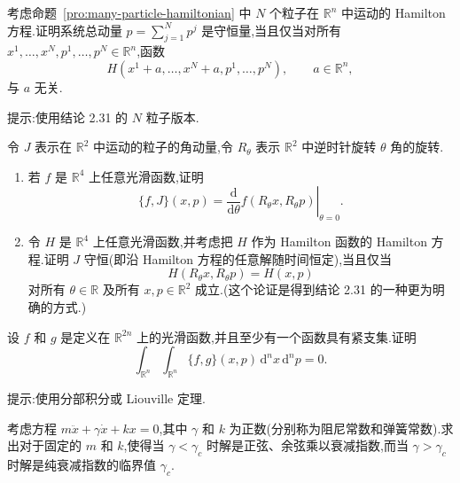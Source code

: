 \begin{exercise}\label{ex:total-momentum-hamiltonian}
考虑命题~\ref{pro:many-particle-hamiltonian} 中 $N$ 个粒子在 $\mathbb{R}^{n}$ 中运动的 Hamilton 方程.证明系统总动量 $p=\sum_{j=1}^{N}p^{j}$ 是守恒量,当且仅当对所有 $x^{1},\ldots,x^{N},p^{1},\ldots,p^{N}\in\mathbb{R}^{n}$,函数
\[
  H(x^{1}+a,\ldots,x^{N}+a,p^{1},\ldots,p^{N}),
  \qquad a\in\mathbb{R}^{n},
\]
与 $a$ 无关.
\begin{note}
提示:使用结论 2.31 的 $N$ 粒子版本.
\end{note}
\end{exercise}

\begin{exercise}\label{ex:angular-momentum-generator}
令 $J$ 表示在 $\mathbb{R}^{2}$ 中运动的粒子的角动量,令 $R_{\theta}$ 表示 $\mathbb{R}^{2}$ 中逆时针旋转 $\theta$ 角的旋转.
\begin{enumerate}[label=(\alph*)]
  \item 若 $f$ 是 $\mathbb{R}^{4}$ 上任意光滑函数,证明
  \[
    \{f,J\}(x,p)
    =\left.\frac{\mathrm{d}}{\mathrm{d}\theta}f(R_{\theta}x,R_{\theta}p)\right|_{\theta=0}.
  \]
  \item 令 $H$ 是 $\mathbb{R}^{4}$ 上任意光滑函数,并考虑把 $H$ 作为 Hamilton 函数的 Hamilton 方程.证明 $J$ 守恒(即沿 Hamilton 方程的任意解随时间恒定),当且仅当
  \[
    H(R_{\theta}x,R_{\theta}p)=H(x,p)
  \]
  对所有 $\theta\in\mathbb{R}$ 及所有 $x,p\in\mathbb{R}^{2}$ 成立.(这个论证是得到结论 2.31 的一种更为明确的方式.)
\end{enumerate}
\end{exercise}

\begin{exercise}\label{ex:poisson-integral}
设 $f$ 和 $g$ 是定义在 $\mathbb{R}^{2n}$ 上的光滑函数,并且至少有一个函数具有紧支集.证明
\[
  \int_{\mathbb{R}^{n}}\int_{\mathbb{R}^{n}}\{f,g\}(x,p)\,\mathrm{d}^{n}x\,\mathrm{d}^{n}p=0.
\]
\begin{note}
提示:使用分部积分或 Liouville 定理.
\end{note}
\end{exercise}

\begin{exercise}\label{ex:damping-critical-value}
考虑方程 $m\ddot{x}+\gamma\dot{x}+kx=0$,其中 $\gamma$ 和 $k$ 为正数(分别称为阻尼常数和弹簧常数).求出对于固定的 $m$ 和 $k$,使得当 $\gamma<\gamma_{c}$ 时解是正弦、余弦乘以衰减指数,而当 $\gamma>\gamma_{c}$ 时解是纯衰减指数的临界值 $\gamma_{c}$.
\end{exercise}

